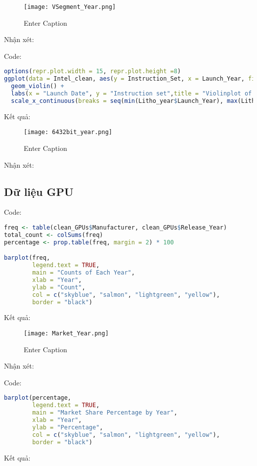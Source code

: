 \begin{figure}[h]
  \centering
  \texttt{[image: VSegment\_Year.png]}
  \vspace{1pt}
  \caption{Enter Caption}
  \label{fig:enter-label}
\end{figure}

Nhận xét:

\newpage
Code:
\begin{lstlisting}[language=R]
options(repr.plot.width = 15, repr.plot.height =8) 
ggplot(data = Intel_clean, aes(y = Instruction_Set, x = Launch_Year, fill = Instruction_Set)) +
  geom_violin() +
  labs(x = "Launch Date", y = "Instruction set",title = "Violinplot of Instruction set over Year") +
  scale_x_continuous(breaks = seq(min(Litho_year$Launch_Year), max(Litho_year$Launch_Year), by = 1))
\end{lstlisting}
Kết quả:

\begin{figure}[h]
  \centering
  \texttt{[image: 6432bit\_year.png]}
  \vspace{1pt}
  \caption{Enter Caption}
  \label{fig:enter-label}
\end{figure}

Nhận xét:



\newpage
\subsection{Dữ liệu GPU}
Code:
\begin{lstlisting}[language=R]
freq <- table(clean_GPUs$Manufacturer, clean_GPUs$Release_Year)
total_count <- colSums(freq)
percentage <- prop.table(freq, margin = 2) * 100

barplot(freq,
        legend.text = TRUE,
        main = "Counts of Each Year",
        xlab = "Year",
        ylab = "Count",
        col = c("skyblue", "salmon", "lightgreen", "yellow"),
        border = "black")
\end{lstlisting}
Kết quả:

\begin{figure}[h]
  \centering
  \texttt{[image: Market\_Year.png]}
  \vspace{1pt}
  \caption{Enter Caption}
  \label{fig:enter-label}
\end{figure}

Nhận xét:

\newpage
Code:
\begin{lstlisting}[language=R]
barplot(percentage,
        legend.text = TRUE,
        main = "Market Share Percentage by Year",
        xlab = "Year",
        ylab = "Percentage",
        col = c("skyblue", "salmon", "lightgreen", "yellow"),
        border = "black")
\end{lstlisting}
Kết quả:

